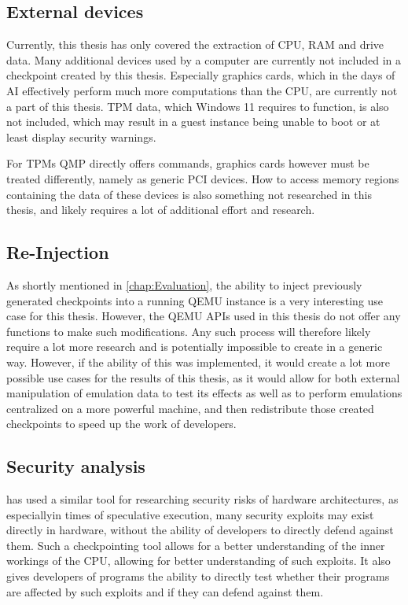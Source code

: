 \subsection{External devices}
Currently, this thesis has only covered the extraction of CPU, RAM and drive data.
Many additional devices used by a computer are currently not included in a checkpoint created by this thesis.
Especially graphics cards, which in the days of AI effectively perform much more computations than the CPU,
are currently not a part of this thesis.
TPM data, which Windows 11 requires to function, is also not included,
which may result in a guest instance being unable to boot or at least display security warnings.

For TPMs QMP directly offers commands, graphics cards however must be treated differently, namely as generic PCI devices.
How to access memory regions containing the data of these devices is also something not researched in this thesis,
and likely requires a lot of additional effort and research.

\subsection{Re-Injection}\label{sec:injection}
As shortly mentioned in \autoref{chap:Evaluation},
the ability to inject previously generated checkpoints into a running QEMU instance is a very interesting use case for this thesis.
However, the QEMU APIs used in this thesis do not offer any functions to make such modifications.
Any such process will therefore likely require a lot more research and is potentially impossible to create in a generic way.
However, if the ability of this was implemented,
it would create a lot more possible use cases for the results of this thesis,
as it would allow for both external manipulation of emulation data to test its effects
as well as to perform emulations centralized on a more powerful machine,
and then redistribute those created checkpoints to speed up the work of developers.

\subsection{Security analysis}
 has used a similar tool for researching security risks of hardware architectures,
as especiallyin times of speculative execution,
many security exploits may exist directly in hardware,
without the ability of developers to directly defend against them\cite{lapidary}.
Such a checkpointing tool allows for a better understanding of the inner workings of the CPU,
allowing for better understanding of such exploits.
It also gives developers of programs the ability to directly test whether their programs
are affected by such exploits and if they can defend against them.

